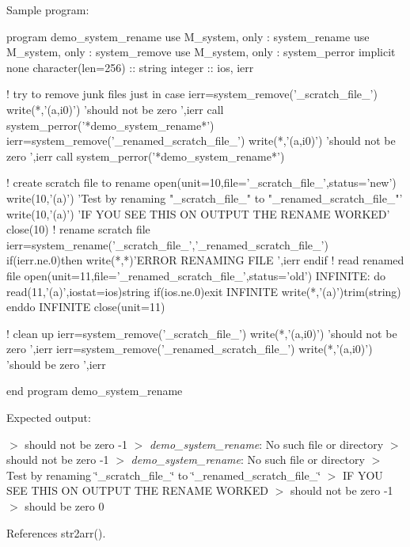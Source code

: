 \begin{DoxyVerb}Sample program:

  program demo_system_rename
  use M_system, only : system_rename
  use M_system, only : system_remove
  use M_system, only : system_perror
  implicit none
  character(len=256) :: string
  integer            :: ios, ierr

  ! try to remove junk files just in case
  ierr=system_remove('_scratch_file_')
  write(*,'(a,i0)') 'should not be zero ',ierr
  call system_perror('*demo_system_rename*')
  ierr=system_remove('_renamed_scratch_file_')
  write(*,'(a,i0)') 'should not be zero ',ierr
  call system_perror('*demo_system_rename*')

  ! create scratch file to rename
  open(unit=10,file='_scratch_file_',status='new')
  write(10,'(a)') 'Test by renaming "_scratch_file_" to "_renamed_scratch_file_"'
  write(10,'(a)') 'IF YOU SEE THIS ON OUTPUT THE RENAME WORKED'
  close(10)
  ! rename scratch file
  ierr=system_rename('_scratch_file_','_renamed_scratch_file_')
  if(ierr.ne.0)then
     write(*,*)'ERROR RENAMING FILE ',ierr
  endif
  ! read renamed file
  open(unit=11,file='_renamed_scratch_file_',status='old')
  INFINITE: do
     read(11,'(a)',iostat=ios)string
     if(ios.ne.0)exit INFINITE
     write(*,'(a)')trim(string)
  enddo INFINITE
  close(unit=11)

  ! clean up
  ierr=system_remove('_scratch_file_')
  write(*,'(a,i0)') 'should not be zero ',ierr
  ierr=system_remove('_renamed_scratch_file_')
  write(*,'(a,i0)') 'should be zero ',ierr

  end program demo_system_rename
\end{DoxyVerb}


Expected output\+:

$>$ should not be zero -\/1 $>$ {\itshape demo\+\_\+system\+\_\+rename}\+: No such file or directory $>$ should not be zero -\/1 $>$ {\itshape demo\+\_\+system\+\_\+rename}\+: No such file or directory $>$ Test by renaming \char`\"{}\+\_\+scratch\+\_\+file\+\_\+\char`\"{} to \char`\"{}\+\_\+renamed\+\_\+scratch\+\_\+file\+\_\+\char`\"{} $>$ IF Y\+OU S\+EE T\+H\+IS ON O\+U\+T\+P\+UT T\+HE R\+E\+N\+A\+ME W\+O\+R\+K\+ED $>$ should not be zero -\/1 $>$ should be zero 0 

References str2arr().

\mbox{\label{namespacem__system_a3ffe757195ade8052e8acabd196ee3ca}} 
